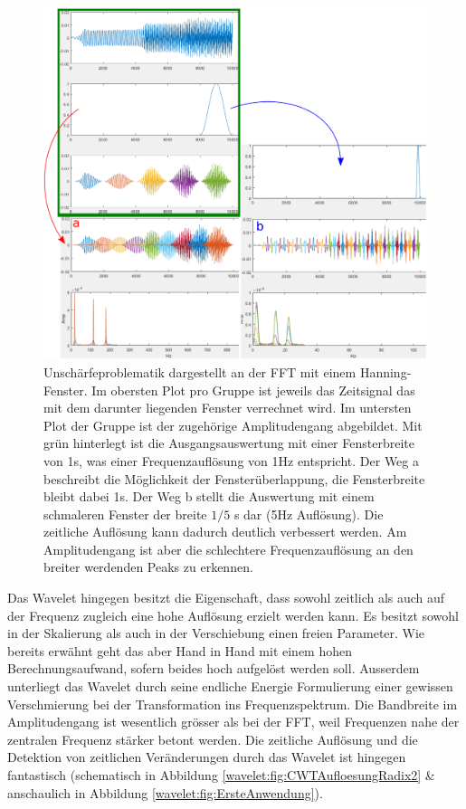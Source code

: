 \begin{figure}
	\centering
	\includegraphics[width=\textwidth]{papers/wavelets/images/6-2_AufloesungZeitVsFrequenz.png}
	\caption{Unschärfeproblematik dargestellt an der FFT mit einem Hanning-Fenster. Im obersten Plot pro Gruppe ist jeweils das Zeitsignal das mit dem darunter liegenden Fenster verrechnet wird. Im untersten Plot der Gruppe ist der zugehörige Amplitudengang abgebildet. Mit grün hinterlegt ist die Ausgangsauswertung mit einer Fensterbreite von 1s, was einer Frequenzauflösung von 1Hz entspricht. Der Weg a beschreibt die Möglichkeit der Fensterüberlappung, die Fensterbreite bleibt dabei 1s. Der Weg b stellt die Auswertung mit einem schmaleren Fenster der breite $1/5$ s dar (5Hz Auflösung). Die zeitliche Auflösung kann dadurch deutlich verbessert werden. Am Amplitudengang ist aber die schlechtere Frequenzauflösung an den breiter werdenden Peaks zu erkennen.}
	\label{wavelet:fig:AufloesungZeitVsFrequenz}
\end{figure}

Das Wavelet hingegen besitzt die Eigenschaft, dass sowohl zeitlich als auch auf der Frequenz zugleich eine hohe Auflösung erzielt werden kann. Es besitzt sowohl in der Skalierung als auch in der Verschiebung einen freien Parameter. Wie bereits erwähnt geht das aber Hand in Hand mit einem hohen Berechnungsaufwand, sofern beides hoch aufgelöst werden soll. Ausserdem unterliegt das Wavelet durch seine endliche Energie Formulierung einer gewissen Verschmierung bei der Transformation ins Frequenzspektrum. Die Bandbreite im Amplitudengang ist wesentlich grösser als bei der FFT, weil Frequenzen nahe der zentralen Frequenz stärker betont werden. Die zeitliche Auflösung und die Detektion von zeitlichen Veränderungen durch das Wavelet ist hingegen fantastisch (schematisch in Abbildung \ref{wavelet:fig:CWTAufloesungRadix2} \& anschaulich in Abbildung \ref{wavelet:fig:ErsteAnwendung}).

